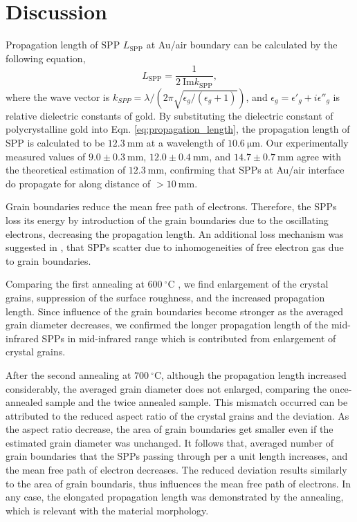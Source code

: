 \documentclass[twocolumn,10.5pt,a4]{article}
\begin{document}
\section{Discussion}
\label{sec:discussion}
Propagation length of SPP $L_{\mathrm{SPP}}$ at Au/air boundary can be calculated by the following equation,
\begin{equation}
 L_{\mathrm{SPP}} = \frac{1}{2\:\mathrm{Im} k_{\mathrm{SPP}}},
\label{eq:propagation_length}
 \end{equation}
where the wave vector is $k_{SPP}=\lambda/(2\pi\sqrt{\epsilon_g/(\epsilon_g+1)})$, and $\epsilon_g=\epsilon'_g+i\epsilon''_g$ is relative dielectric constants of gold. 
By substituting the dielectric constant of polycrystalline gold\cite{Palik} into Eqn. \ref{eq:propagation_length}, the propagation length of SPP is calculated to be $12.3\:\mathrm{mm}$ at a wavelength of $10.6\:\mathrm{\mu m}$.
Our experimentally measured values of  $9.0\pm0.3\:\mathrm{mm}$, $12.0\pm0.4\:\mathrm{mm}$, and $14.7\pm0.7\:\mathrm{mm}$ agree with the theoretical estimation of $12.3\:\mathrm{mm}$, confirming that SPPs at Au/air interface do propagate for along distance of $>10\:\mathrm{mm}$.

Grain boundaries reduce the mean free path of electrons\cite{Jens}. Therefore, the SPPs loss its energy by introduction of the grain boundaries due to the oscillating electrons, decreasing the propagation length. 
An additional loss mechanism was suggested in \cite{Kuttge}, that SPPs scatter due to inhomogeneities of free electron gas due to grain boundaries. 

Comparing the first annealing at $600\:^\circ\mathrm{C}$ , we find enlargement of the crystal grains, suppression of the surface roughness, and the increased propagation length. Since influence of the grain boundaries become stronger as the averaged grain diameter decreases, we confirmed the longer propagation length of the mid-infrared SPPs in mid-infrared range which is contributed from enlargement of crystal grains.

After the second annealing at $700\:^\circ\mathrm{C}$, although the propagation length increased considerably, the averaged grain diameter does not enlarged, comparing the once-annealed sample and the twice annealed sample. 
This mismatch occurred can be attributed to the reduced aspect ratio of the crystal grains and the deviation. As the aspect ratio decrease, the area of grain boundaries get smaller even if the estimated grain diameter was unchanged. It follows that, averaged number of grain boundaries that the SPPs passing through per a unit length increases, and the mean free path of electron decreases. The reduced deviation results similarly to the area of grain boundaris, thus influences the mean free path of electrons.
In any case, the elongated propagation length was demonstrated by the annealing, which is relevant with the material morphology.
\end{document}

